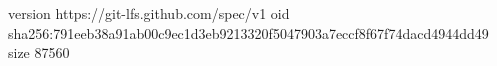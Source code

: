 version https://git-lfs.github.com/spec/v1
oid sha256:791eeb38a91ab00c9ec1d3eb9213320f5047903a7eccf8f67f74dacd4944dd49
size 87560
